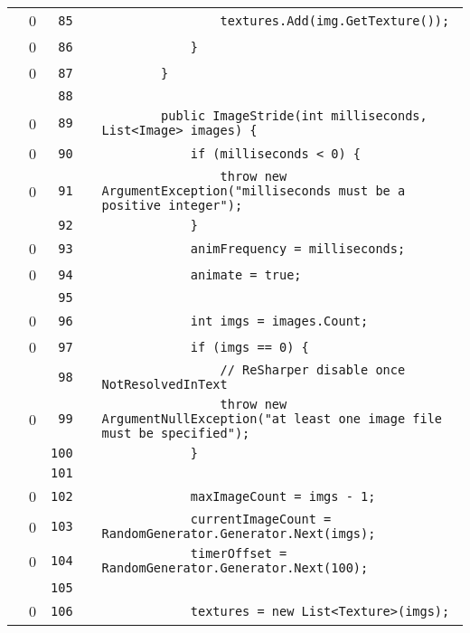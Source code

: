 \documentclass[a4paper,landscape,10pt]{article}
\begin{document}
\begin{longtable}[l]{lrrll}
\cellcolor{red} & 0 & \verb~85~ & & \verb~                textures.Add(img.GetTexture());~\\
\cellcolor{red} & 0 & \verb~86~ & & \verb~            }~\\
\cellcolor{red} & 0 & \verb~87~ & & \verb~        }~\\
\cellcolor{gray} &  & \verb~88~ & & \verb~~\\
\cellcolor{red} & 0 & \verb~89~ & & \verb~        public ImageStride(int milliseconds, List<Image> images) {~\\
\cellcolor{red} & 0 & \verb~90~ & & \verb~            if (milliseconds < 0) {~\\
\cellcolor{red} & 0 & \verb~91~ & & \verb~                throw new ArgumentException("milliseconds must be a positive integer");~\\
\cellcolor{gray} &  & \verb~92~ & & \verb~            }~\\
\cellcolor{red} & 0 & \verb~93~ & & \verb~            animFrequency = milliseconds;~\\
\cellcolor{red} & 0 & \verb~94~ & & \verb~            animate = true;~\\
\cellcolor{gray} &  & \verb~95~ & & \verb~~\\
\cellcolor{red} & 0 & \verb~96~ & & \verb~            int imgs = images.Count;~\\
\cellcolor{red} & 0 & \verb~97~ & & \verb~            if (imgs == 0) {~\\
\cellcolor{gray} &  & \verb~98~ & & \verb~                // ReSharper disable once NotResolvedInText~\\
\cellcolor{red} & 0 & \verb~99~ & & \verb~                throw new ArgumentNullException("at least one image file must be specified");~\\
\cellcolor{gray} &  & \verb~100~ & & \verb~            }~\\
\cellcolor{gray} &  & \verb~101~ & & \verb~~\\
\cellcolor{red} & 0 & \verb~102~ & & \verb~            maxImageCount = imgs - 1;~\\
\cellcolor{red} & 0 & \verb~103~ & & \verb~            currentImageCount = RandomGenerator.Generator.Next(imgs);~\\
\cellcolor{red} & 0 & \verb~104~ & & \verb~            timerOffset = RandomGenerator.Generator.Next(100);~\\
\cellcolor{gray} &  & \verb~105~ & & \verb~~\\
\cellcolor{red} & 0 & \verb~106~ & & \verb~            textures = new List<Texture>(imgs);~\\

\end{longtable}
\end{document}

